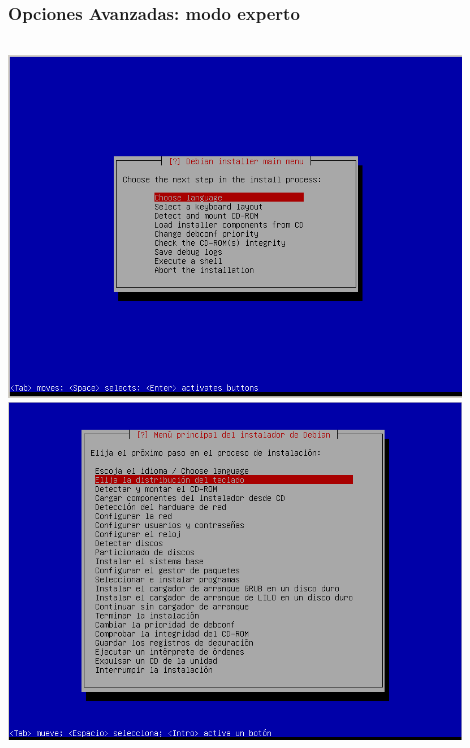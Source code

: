 \documentclass{beamer}
\begin{document}
\begin{frame}
\frametitle{Opciones Avanzadas: modo experto}
  \begin{columns}
	\includegraphics[width=0.9\textwidth]{./imgs/3_1_expert_install.png} \hspace*{7.3cm}
	\includegraphics[width=0.9\textwidth]{./imgs/6_modo_expert.png} \hspace*{7.3cm}
  \end{columns}
\end{frame}
\end{document}
